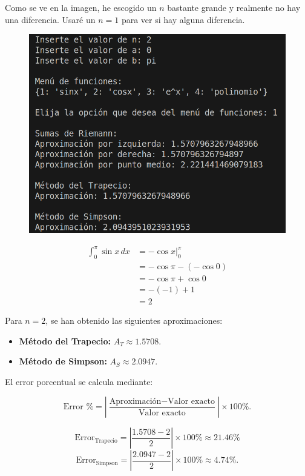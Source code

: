 Como se ve en la imagen, he escogido un $n$ bastante grande y realmente no hay una diferencia. Usaré un $n = 1$ para ver si hay alguna diferencia.

\begin{figure}[H]
    \centering
    \includegraphics[scale=0.25]{images/python2_1.png}
    \label{fig:integralSeno_Simpson_Trapecio}
\end{figure}

\begin{align*}
    \int_{0}^{\pi} \sin x \,dx 
      &= \left. -\cos x \right|_{0}^{\pi} \\
      &= -\cos \pi - (-\cos 0) \\
      &= -\cos \pi + \cos 0 \\
      &= -(-1) + 1 \\
      &= 2
    \end{align*}

Para \(n = 2\), se han obtenido las siguientes aproximaciones:
\begin{itemize}
    \item \textbf{Método del Trapecio:} \(A_T \approx 1.5708\).
    \item \textbf{Método de Simpson:} \(A_S \approx 2.0947\).
\end{itemize}

El error porcentual se calcula mediante:

\[
\text{Error \%} = \left|\frac{\text{Aproximación} - \text{Valor exacto}}{\text{Valor exacto}}\right| \times 100\%.
\]

\[
\text{Error}_{\text{Trapecio}} = \left|\frac{1.5708 - 2}{2}\right| \times 100\% \approx 21.46\%
\]
\[
\text{Error}_{\text{Simpson}} = \left|\frac{2.0947 - 2}{2}\right| \times 100\% \approx 4.74\%.
\]

